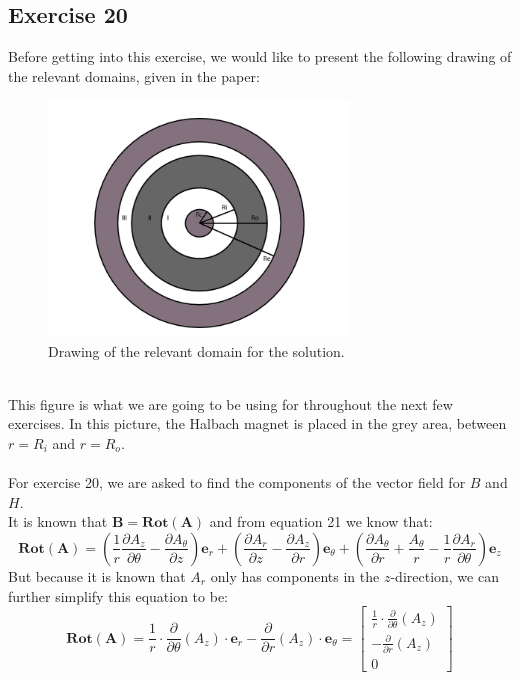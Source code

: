\documentclass{article}
\begin{document}
\subsection{Exercise 20}
Before getting into this exercise, we would like to present the following drawing of the relevant domains, given in the paper:
\begin{figure}[h!]
\includegraphics[width=8cm]{zones.PNG}
\centering
\caption{Drawing of the relevant domain for the solution.}
\end{figure}
\\
This figure is what we are going to be using for throughout the next few exercises. In this picture, the Halbach magnet is placed in the grey area, between $r=R_{i}$ and $r=R_{o}$.
\\
\\
For exercise 20, we are asked to find the components of the vector field for $B$ and $H$. 
\\
It is known that $\mathbf{B} = \mathbf{Rot(A)}$ and from equation 21 we know that:
\begin{equation}
    \mathbf{Rot(A)} = \left(\frac{1}{r}\frac{\partial A_{z}}{\partial \theta}-\frac{\partial A_{\theta}}{\partial z}\right)\mathbf{e}_{r}+\left(\frac{\partial A_{r}}{\partial z}-\frac{\partial A_{z}}{\partial r}\right)\mathbf{e}_{\theta}+\left(\frac{\partial A_{\theta}}{\partial r}+\frac{A_{\theta}}{r}-\frac{1}{r}\frac{\partial A_{r}}{\partial \theta}\right)\mathbf{e}_{z}
\end{equation}
But because it is known that $A_r$ only has components in the $z$-direction, we can further simplify this equation to be:
\begin{equation}
\mathbf{Rot(A)} = \frac{1}{r}\cdot \frac{\partial}{\partial \theta}\left(A_{z}\right)\cdot \mathbf{e}_{r}-\frac{\partial}{\partial r}\left(A_{z}\right)\cdot \mathbf{e}_{\theta}=\left[\begin{array}{c}
\frac{1}{r}\cdot \frac{\partial}{\partial \theta}\left(A_{z}\right) 
\\
 -\frac{\partial}{\partial r}\left(A_{z}\right) 
\\
 0 
\end{array}\right]
\end{equation}
\end{document}
